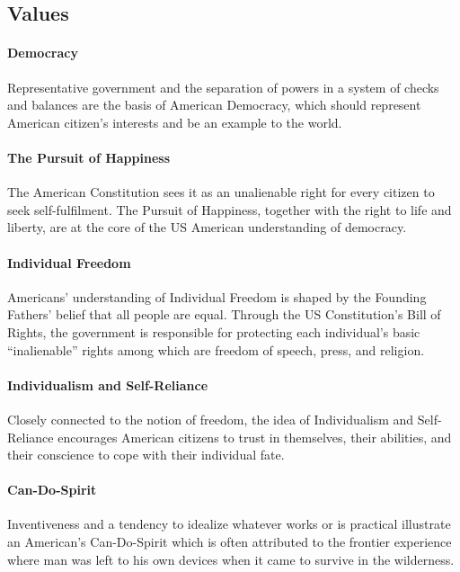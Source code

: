 \documentclass[10pt]{article}
\begin{document}
\subsection{Values}
\label{sec:usa/values}
\paragraph{Democracy}
\label{par:usa/values/dem}
Representative government and the separation of powers in a system of checks
and balances are the basis of American Democracy, which should represent American
citizen's interests and be an example to the world.

\paragraph{The Pursuit of Happiness}
\label{par:usa/values/poh}
The American Constitution sees it as an unalienable right for every citizen to seek
self-fulfilment. The Pursuit of Happiness, together with the right to life and liberty, are at the core of the
US American understanding of democracy.

\paragraph{Individual Freedom}
\label{par:usa/values/free}
Americans' understanding of Individual Freedom is shaped by the Founding Fathers' belief that all
people are equal. Through the US Constitution's Bill of Rights, the government is
responsible for protecting each individual's basic \enquote{inalienable} rights among
which are freedom of speech, press, and religion.

\paragraph{Individualism and Self-Reliance}
\label{par:usa/values/indiv}
Closely connected to the notion of freedom, the idea of Individualism and Self-Reliance encourages American
citizens to trust in themselves, their abilities, and their conscience to cope with
their individual fate.

\paragraph{Can-Do-Spirit}
\label{par:usa/values/cds}
Inventiveness and a tendency to idealize whatever works or is practical illustrate
an American's Can-Do-Spirit which is often attributed to the frontier experience where man
was left to his own devices when it came to survive in the wilderness.
\end{document}
